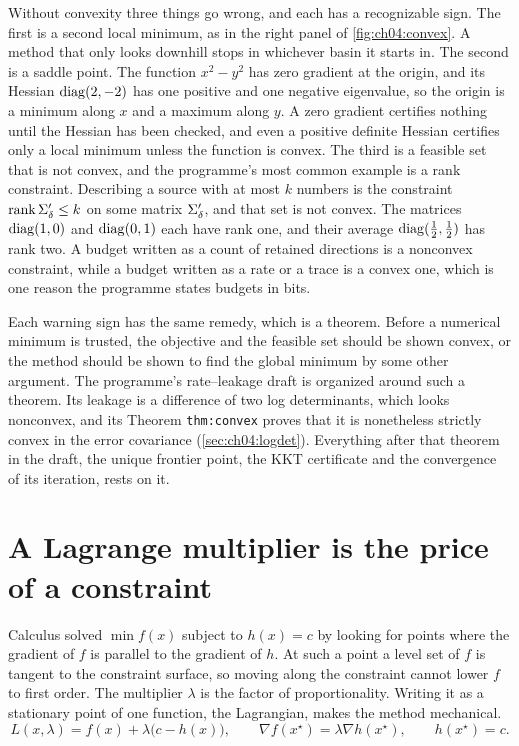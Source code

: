 Without convexity three things go wrong, and each has a recognizable sign. The first is a second local minimum, as in the right panel of \cref{fig:ch04:convex}. A method that only looks downhill stops in whichever basin it starts in. The second is a saddle point. The function $x^2-y^2$ has zero gradient at the origin, and its Hessian $\operatorname{diag}(2,-2)$ has one positive and one negative eigenvalue, so the origin is a minimum along $x$ and a maximum along $y$. A zero gradient certifies nothing until the Hessian has been checked, and even a positive definite Hessian certifies only a local minimum unless the function is convex. The third is a feasible set that is not convex, and the programme's most common example is a rank constraint. Describing a source with at most $k$ numbers is the constraint $\operatorname{rank}\Sigma_\delta'\le k$ on some matrix $\Sigma_\delta'$, and that set is not convex. The matrices $\operatorname{diag}(1,0)$ and $\operatorname{diag}(0,1)$ each have rank one, and their average $\operatorname{diag}(\frac12,\frac12)$ has rank two. A budget written as a count of retained directions is a nonconvex constraint, while a budget written as a rate or a trace is a convex one, which is one reason the programme states budgets in bits.

Each warning sign has the same remedy, which is a theorem. Before a numerical minimum is trusted, the objective and the feasible set should be shown convex, or the method should be shown to find the global minimum by some other argument. The programme's rate--leakage draft is organized around such a theorem. Its leakage is a difference of two log determinants, which looks nonconvex, and its Theorem \texttt{thm:convex} proves that it is nonetheless strictly convex in the error covariance (\cref{sec:ch04:logdet}). Everything after that theorem in the draft, the unique frontier point, the KKT certificate and the convergence of its iteration, rests on it.


\section{A Lagrange multiplier is the price of a constraint}\label{sec:ch04:lagrange}

Calculus solved $\min f(x)$ subject to $h(x)=c$ by looking for points where the gradient of $f$ is parallel to the gradient of $h$. At such a point a level set of $f$ is tangent to the constraint surface, so moving along the constraint cannot lower $f$ to first order. The multiplier $\lambda$ is the factor of proportionality. Writing it as a stationary point of one function, the Lagrangian, makes the method mechanical.
\begin{equation}\label{eq:ch04:lagrange}
L(x,\lambda)=f(x)+\lambda\bigl(c-h(x)\bigr),\qquad
\nabla f(x^\star)=\lambda\nabla h(x^\star),\qquad h(x^\star)=c .
\end{equation}

